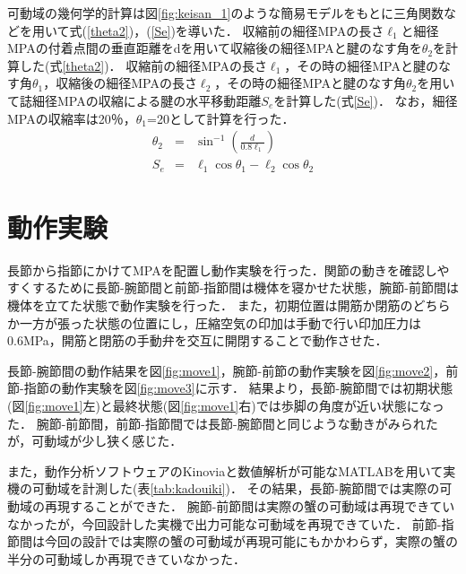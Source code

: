 \documentclass{jarticle}
\begin{document}
可動域の幾何学的計算は図\ref{fig:keisan_1}のような簡易モデルをもとに三角関数などを用いて式(\ref{theta2})，(\ref{Se})を導いた．
収縮前の細径MPAの長さ$\ell_1$と細径MPAの付着点間の垂直距離をdを用いて収縮後の細径MPAと腱のなす角を$\theta_{2}$を計算した(式\ref{theta2})．
収縮前の細径MPAの長さ$\ell_1$，その時の細径MPAと腱のなす角$\theta_{1}$，収縮後の細径MPAの長さ$\ell_2$，その時の細径MPAと腱のなす角$\theta_{2}$を用いて誌細径MPAの収縮による腱の水平移動距離$S_e$を計算した(式\ref{Se})．
なお，細径MPAの収縮率は20％，$\theta_{1}$=20として計算を行った．
\begin{eqnarray}
	\label{theta2} \theta_2 &=& \sin^{-1}\left(\frac{d}{0.8 \ell_1}\right)\\
  \label{Se} S_e &=& \ell_1 \cos\theta_1 - \ell_2 \cos\theta_2
\end{eqnarray}
\vspace*{-2mm}
\section{動作実験}
長節から指節にかけてMPAを配置し動作実験を行った．関節の動きを確認しやすくするために長節-腕節間と前節-指節間は機体を寝かせた状態，腕節-前節間は機体を立てた状態で動作実験を行った．
また，初期位置は開筋か閉筋のどちらか一方が張った状態の位置にし，圧縮空気の印加は手動で行い印加圧力は0.6MPa，開筋と閉筋の手動弁を交互に開閉することで動作させた．

長節-腕節間の動作結果を図\ref{fig:move1}，腕節-前節の動作実験を図\ref{fig:move2}，前節-指節の動作実験を図\ref{fig:move3}に示す．
結果より，長節-腕節間では初期状態(図\ref{fig:move1}左)と最終状態(図\ref{fig:move1}右)では歩脚の角度が近い状態になった．
腕節-前節間，前節-指節間では長節-腕節間と同じような動きがみられたが，可動域が少し狭く感じた．

また，動作分析ソフトウェアのKinoviaと数値解析が可能なMATLABを用いて実機の可動域を計測した(表\ref{tab:kadouiki})．
その結果，長節-腕節間では実際の可動域の再現することができた．
腕節-前節間は実際の蟹の可動域は再現できていなかったが，今回設計した実機で出力可能な可動域を再現できていた．
前節-指節間は今回の設計では実際の蟹の可動域が再現可能にもかかわらず，実際の蟹の半分の可動域しか再現できていなかった．
\vspace*{-2mm}
\end{document}
